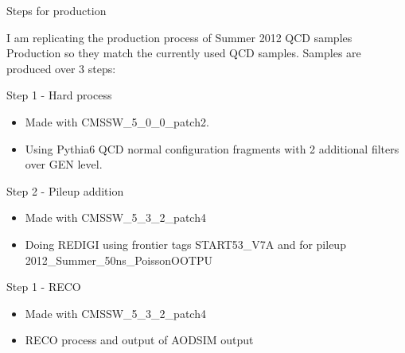 \documentclass[8pt]{beamer}
\begin{document}
\begin{frame}{Steps for production}
 
I am replicating the production process of Summer 2012 QCD samples Production so they match the currently used QCD samples. Samples are produced over 3 steps:

\begin{block}{Step 1 - Hard process}
 
  \begin{itemize}
    \item Made with CMSSW\_5\_0\_0\_patch2.
    \item Using Pythia6 QCD normal configuration fragments with 2 additional filters over GEN level.
  \end{itemize} 
 
\end{block}

\begin{block}{Step 2 - Pileup addition}
 
  \begin{itemize}
    \item Made with CMSSW\_5\_3\_2\_patch4
    \item Doing REDIGI using frontier tags START53\_V7A and for pileup 2012\_Summer\_50ns\_PoissonOOTPU
  \end{itemize} 
 
\end{block}

\begin{block}{Step 1 - RECO}
 
  \begin{itemize}
    \item Made with CMSSW\_5\_3\_2\_patch4 
    \item RECO process and output of AODSIM output
  \end{itemize} 
 
\end{block}
 
\end{frame}
\end{document}

